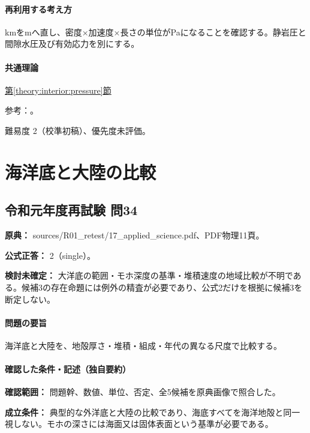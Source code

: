 \paragraph{再利用する考え方} kmをmへ直し、密度×加速度×長さの単位がPaになることを確認する。静岩圧と間隙水圧及び有効応力を別にする。

\paragraph{共通理論} \hyperref[theory:interior:pressure]{第\ref*{theory:interior:pressure}節}

\par 参考：\cite{usgs_lithosphere2002}。

\par 難易度 2（校準初稿）、優先度未評価。

\section{海洋底と大陸の比較}

\subsection{令和元年度再試験 問34}
\label{q:r01-ret-applied-34}

\noindent\textbf{原典：} sources/R01\_retest/17\_applied\_science.pdf、PDF物理11頁。

\textbf{公式正答：} 2（single）。

\par\textbf{検討未確定：} 大洋底の範囲・モホ深度の基準・堆積速度の地域比較が不明である。候補3の存在命題には例外の精査が必要であり、公式2だけを根拠に候補3を断定しない。

\paragraph{問題の要旨} 海洋底と大陸を、地殻厚さ・堆積・組成・年代の異なる尺度で比較する。

\paragraph{確認した条件・記述（独自要約）}\mbox{}\par

\noindent\textbf{確認範囲：} 問題幹、数値、単位、否定、全5候補を原典画像で照合した。\par

\noindent\textbf{成立条件：} 典型的な外洋底と大陸の比較であり、海底すべてを海洋地殻と同一視しない。モホの深さには海面又は固体表面という基準が必要である。\par

